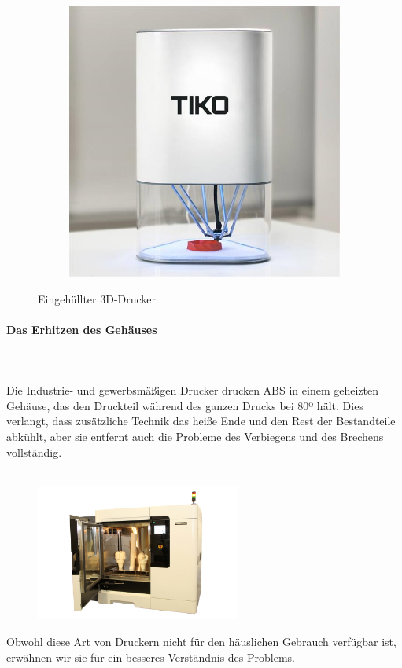 \documentclass[11pt,a4paper]{article}
\begin{document}
\begin{figure}[H]
\begin{subfigure}[b]{0.3\textwidth}
        \includegraphics[width=\textwidth,cfbox=azul_marcos 4pt 0pt]{FOTOS/IMPRESORACERRADA3}
    \end{subfigure}
    \caption*{Eingehüllter 3D-Drucker}
\end{figure}
			\paragraph{Das Erhitzen des Gehäuses}\mbox{}\\\\
Die Industrie- und gewerbsmäßigen Drucker drucken ABS in einem geheizten Gehäuse, das den Druckteil während des ganzen Drucks bei 80º hält. Dies verlangt, dass zusätzliche Technik das heiße Ende und den Rest der Bestandteile abkühlt, aber sie entfernt auch die Probleme des Verbiegens und des Brechens vollständig.
\\\\
\begin{figure}[H]
\centering
\includegraphics[width=0.6\textwidth,cfbox=azul_marcos 4pt 0pt]{FOTOS/STRATASYS}
\end{figure}
Obwohl diese Art von Druckern nicht für den häuslichen Gebrauch verfügbar ist, erwähnen wir sie für ein besseres Verständnis des Problems.
\end{document}
